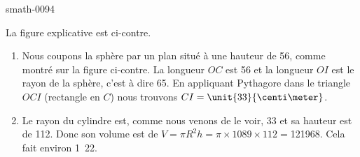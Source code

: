 
\begin{corrige}{smath-0094}


\begin{wrapfigure}{r}{3.5cm}
   \vspace{-0.5cm}        %
   \centering
   
\end{wrapfigure}

La figure explicative est ci-contre.

    \begin{enumerate}
        \item
            Nous coupons la sphère par un plan situé à une hauteur de \unit{56}{\centi\meter}, comme montré sur la figure ci-contre. La longueur \( OC\) est \unit{56}{\centi\meter} et la longueur \( OI\) est le rayon de la sphère, c'est à dire \unit{65}{\centi\meter}. En appliquant Pythagore dans le triangle \( OCI\) (rectangle en \( C\)) nous trouvons \( CI=\unit{33}{\centi\meter}\).
        \item
            Le rayon du cylindre est, comme nous venons de le voir, \unit{33}{\centi\meter} et sa hauteur est de \unit{112}{\centi\meter}. Donc son volume est de \( V=\pi R^2h=\pi\times 1089\times 112=\)\unit{121968}{\centi\cubic\meter}. Cela fait environ \unit{1.22}{\deci\cubic\meter}.
           
    \end{enumerate}

\end{corrige}
